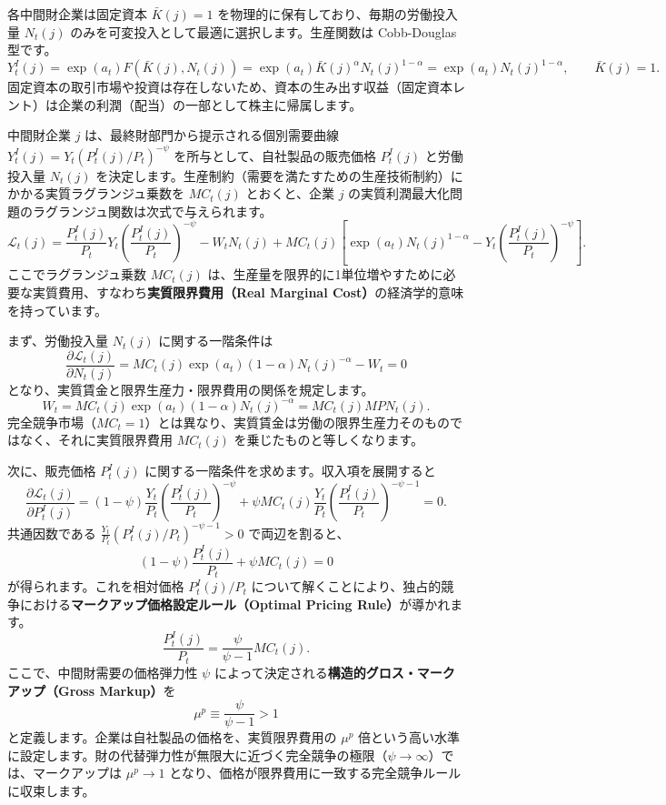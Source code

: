 \documentclass[
  japanese,
  lualatex,
  ja=standard,
  12pt,
  a4paper]{ltjsarticle}
\begin{document}
各中間財企業は固定資本 \(\bar{K}(j) = 1\)
を物理的に保有しており、毎期の労働投入量 \(N_t(j)\)
のみを可変投入として最適に選択します。生産関数は Cobb-Douglas 型です。
\[
Y_t^I(j) = \exp(a_t) F(\bar{K}(j), N_t(j)) = \exp(a_t) \bar{K}(j)^\alpha N_t(j)^{1-\alpha} = \exp(a_t) N_t(j)^{1-\alpha}, \qquad \bar{K}(j)=1.
\]
固定資本の取引市場や投資は存在しないため、資本の生み出す収益（固定資本レント）は企業の利潤（配当）の一部として株主に帰属します。

中間財企業 \(j\) は、最終財部門から提示される個別需要曲線
\(Y_t^I(j) = Y_t (P_t^I(j)/P_t)^{-\psi}\)
を所与として、自社製品の販売価格 \(P_t^I(j)\) と労働投入量 \(N_t(j)\)
を決定します。生産制約（需要を満たすための生産技術制約）にかかる実質ラグランジュ乗数を
\(MC_t(j)\) とおくと、企業 \(j\)
の実質利潤最大化問題のラグランジュ関数は次式で与えられます。 \[
\mathcal{L}_t(j) = \frac{P_t^I(j)}{P_t} Y_t \left( \frac{P_t^I(j)}{P_t} \right)^{-\psi} - W_t N_t(j) + MC_t(j) \left[ \exp(a_t) N_t(j)^{1-\alpha} - Y_t \left( \frac{P_t^I(j)}{P_t} \right)^{-\psi} \right].
\] ここでラグランジュ乗数 \(MC_t(j)\)
は、生産量を限界的に1単位増やすために必要な実質費用、すなわち\textbf{実質限界費用（Real
Marginal Cost）}の経済学的意味を持っています。

まず、労働投入量 \(N_t(j)\) に関する一階条件は \[
\frac{\partial \mathcal{L}_t(j)}{\partial N_t(j)} = MC_t(j) \exp(a_t) (1-\alpha) N_t(j)^{-\alpha} - W_t = 0
\] となり、実質賃金と限界生産力・限界費用の関係を規定します。 \[
W_t = MC_t(j) \exp(a_t) (1-\alpha) N_t(j)^{-\alpha} = MC_t(j) MPN_t(j).
\]
完全競争市場（\(MC_t = 1\)）とは異なり、実質賃金は労働の限界生産力そのものではなく、それに実質限界費用
\(MC_t(j)\) を乗じたものと等しくなります。

次に、販売価格 \(P_t^I(j)\)
に関する一階条件を求めます。収入項を展開すると \[
\frac{\partial \mathcal{L}_t(j)}{\partial P_t^I(j)} = (1-\psi) \frac{Y_t}{P_t} \left( \frac{P_t^I(j)}{P_t} \right)^{-\psi} + \psi MC_t(j) \frac{Y_t}{P_t} \left( \frac{P_t^I(j)}{P_t} \right)^{-\psi - 1} = 0.
\] 共通因数である \(\frac{Y_t}{P_t} (P_t^I(j)/P_t)^{-\psi - 1} > 0\)
で両辺を割ると、 \[
(1-\psi) \frac{P_t^I(j)}{P_t} + \psi MC_t(j) = 0
\] が得られます。これを相対価格 \(P_t^I(j)/P_t\)
について解くことにより、独占的競争における\textbf{マークアップ価格設定ルール（Optimal
Pricing Rule）}が導かれます。 \[
\frac{P_t^I(j)}{P_t} = \frac{\psi}{\psi-1} MC_t(j).
\] ここで、中間財需要の価格弾力性 \(\psi\)
によって決定される\textbf{構造的グロス・マークアップ（Gross Markup）}を
\[
\mu^p \equiv \frac{\psi}{\psi-1} > 1
\] と定義します。企業は自社製品の価格を、実質限界費用の \(\mu^p\)
倍という高い水準に設定します。財の代替弾力性が無限大に近づく完全競争の極限（\(\psi \to \infty\)）では、マークアップは
\(\mu^p \to 1\)
となり、価格が限界費用に一致する完全競争ルールに収束します。
\end{document}
